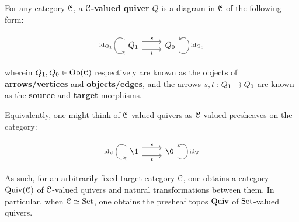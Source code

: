             \begin{definition}[Quivers] \label{def: quivers}
                For any category $\mathcal{C}$, a \textbf{$\mathcal{C}$-valued quiver} $Q$ is a diagram in $\mathcal{C}$ of the following form:
                    $$
                        \begin{tikzcd}
                            Q_1 \arrow[r, "t"', shift right=2] \arrow[r, "s", shift left=2] \arrow["\id_{Q_1}"', loop, distance=2em, in=215, out=145] & Q_0 \arrow["\id_{Q_0}"', loop, distance=2em, in=35, out=325]
                        \end{tikzcd}
                    $$
                wherein $Q_1, Q_0 \in \mathrm{Ob}(\mathcal{C})$ respectively are known as the objects of \textbf{arrows/vertices} and \textbf{objects/edges}, and the arrows $s, t: Q_1 \rightrightarrows Q_0$ are known as the \textbf{source} and \textbf{target} morphisms. 
            \end{definition}
            \begin{remark}
                Equivalently, one might think of $\mathcal{C}$-valued quivers as $\mathcal{C}$-valued presheaves on the category:
                    $$
                        \begin{tikzcd}
                            {\1} \arrow[r, "t"', shift right=2] \arrow[r, "s", shift left=2] \arrow["\id_{\1}"', loop, distance=2em, in=215, out=145] & {\0} \arrow["\id_{\0}"', loop, distance=2em, in=35, out=325]
                        \end{tikzcd}
                    $$
                As such, for an arbitrarily fixed target category $\mathcal{C}$, one obtains a category $\mathrm{Quiv}(\mathcal{C})$ of $\mathcal{C}$-valued quivers and natural transformations between them. In particular, when $\mathcal{C} \simeq \mathrm{Set}$, one obtains the presheaf topos $\mathrm{Quiv}$ of $\mathrm{Set}$-valued quivers. 
            \end{remark}
